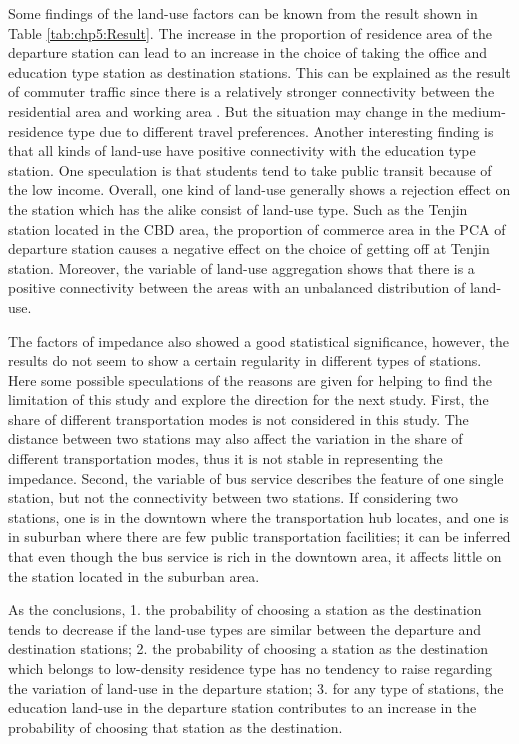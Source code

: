 %
Some findings of the land-use factors can be known from the result shown in Table \ref{tab:chp5:Result}. The increase in the proportion of residence area of the departure station can lead to an increase in the choice of taking the office and education type station as destination stations. This can be explained as the result of commuter traffic since there is a relatively stronger connectivity between the residential area and working area \cite{badoe2000transportation}. But the situation may change in the medium-residence type due to different travel preferences. Another interesting finding is that all kinds of land-use have positive connectivity with the education type station. One speculation is that students tend to take public transit because of the low income. Overall, one kind of land-use generally shows a rejection effect on the station which has the alike consist of land-use type. Such as the Tenjin station located in the CBD area, the proportion of commerce area in the PCA of departure station causes a negative effect on the choice of getting off at Tenjin station. Moreover, the variable of land-use aggregation shows that there is a positive connectivity between the areas with an unbalanced distribution of land-use.

%
The factors of impedance also showed a good statistical significance, however, the results do not seem to show a certain regularity in different types of stations. Here some possible speculations of the reasons are given for helping to find the limitation of this study and explore the direction for the next study. First, the share of different transportation modes is not considered in this study. The distance between two stations may also affect the variation in the share of different transportation modes, thus it is not stable in representing the impedance.  Second, the variable of bus service describes the feature of one single station, but not the connectivity between two stations. If considering two stations, one is in the downtown where the transportation hub locates, and one is in suburban where there are few public transportation facilities; it can be inferred that even though the bus service is rich in the downtown area, it affects little on the station located in the suburban area.

%
As the conclusions, 1. the probability of choosing a station as the destination tends to decrease if the land-use types are similar between the departure and destination stations; 2. the probability of choosing a station as the destination which belongs to low-density residence type has no tendency to raise regarding the variation of land-use in the departure station; 3. for any type of stations, the education land-use in the departure station contributes to an increase in the probability of choosing that station as the destination.

